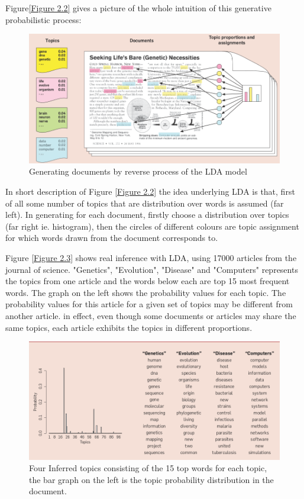 Figure\eqref{Figure 2.2}  gives a picture of the whole intuition of this generative probabilistic process:

\begin{figure}[hbtp]
\centering
\includegraphics[scale=0.5]{DLA.png}
\caption{Generating documents by reverse process of the LDA model}\label{Figure 2.2}
\end{figure}
In short description of Figure \eqref{Figure 2.2} the idea underlying LDA is that, first of all some number of topics that are distribution over words is assumed (far left). In generating for each document, firstly choose a distribution over topics (far right ie. histogram), then the circles of different colours are topic assignment for which words drawn from the document corresponds to.

Figure \eqref{Figure 2.3} shows real inference with LDA, using 17000 articles from the journal of science. "Genetics", "Evolution", "Disease" and "Computers" represents the topics  from one article and the words below each are top 15 most frequent words. The graph on the left shows the probability values for each topic.
The probability values for this article for a given set of topics may be different from another article. in effect, even though some documents or articles may share the same topics, each article exhibits the topics in different proportions.
\begin{figure}[hbtp]
\centering
\includegraphics[scale=0.5]{infered_topics.png}
\caption{Four Inferred topics consisting of the 15 top words for each topic, the bar graph on the left is the topic probability distribution in the document.}
\label{Figure 2.3}
 \end{figure} 
